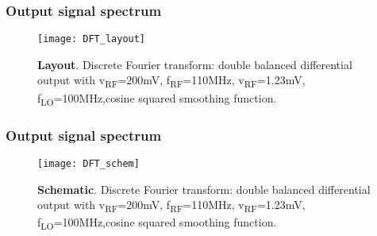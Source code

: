 \begin{frame}
\frametitle{Output signal spectrum}
	\begin{figure}[H]
		\centering
		\texttt{[image: DFT\_layout]}
		\caption{\textbf{Layout}. Discrete Fourier transform: double balanced differential output with v\textsubscript{RF}=200mV,  f\textsubscript{RF}=110MHz, v\textsubscript{RF}=1.23mV, f\textsubscript{LO}=100MHz,cosine squared smoothing function.}
	\end{figure}
\end{frame}

\begin{frame}
\frametitle{Output signal spectrum}
	\begin{figure}[H]
	\centering
	\texttt{[image: DFT\_schem]}
	\caption{\textbf{Schematic}. Discrete Fourier transform: double balanced differential output with v\textsubscript{RF}=200mV,  f\textsubscript{RF}=110MHz, v\textsubscript{RF}=1.23mV, f\textsubscript{LO}=100MHz,cosine squared smoothing function.}
	\end{figure}
\end{frame}

